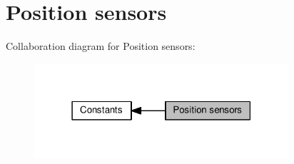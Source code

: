\hypertarget{group__IL__CONST__POS__SENSOR}{}\section{Position sensors}
\label{group__IL__CONST__POS__SENSOR}
Collaboration diagram for Position sensors\+:\nopagebreak
\begin{figure}[H]
\begin{center}
\leavevmode
\includegraphics[width=267pt]{group__IL__CONST__POS__SENSOR}
\end{center}
\end{figure}
